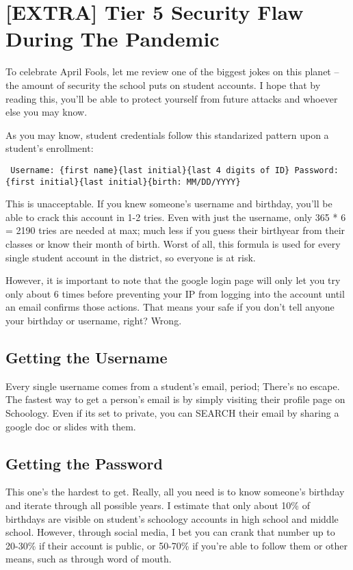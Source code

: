 \section{[EXTRA] Tier 5 Security Flaw During The Pandemic}

To celebrate April Fools, let me review one of the biggest jokes on this planet -- the amount of security the school puts on student accounts. I hope that by reading this, you'll be able to protect yourself from future attacks and whoever else you may know.

As you may know, student credentials follow this standarized pattern upon a student's enrollment:

\begin{centering}
\texttt{
Username: \{first name\}\{last initial\}\{last 4 digits of ID\} \newline
Password: \{first initial\}\{last initial\}\{birth: MM/DD/YYYY\}
}
\end{centering}

This is unacceptable. If you knew someone's username and birthday, you'll be able to crack this account in 1-2 tries. Even with just the username, only 365 * 6 = 2190 tries are needed at max; much less if you guess their birthyear from their classes or know their month of birth. Worst of all, this formula is used for every single student account in the district, so everyone is at risk.

However, it is important to note that the google login page will only let you try only about 6 times before preventing your IP from logging into the account until an email confirms those actions. That means your safe if you don't tell anyone your birthday or username, right? Wrong.

\subsection{Getting the Username}

Every single username comes from a student's email, period; There's no escape. The fastest way to get a person's email is by simply visiting their profile page on Schoology. Even if its set to private, you can SEARCH their email by sharing a google doc or slides with them.

\subsection{Getting the Password}

This one's the hardest to get. Really, all you need is to know someone's birthday and iterate through all possible years. I estimate that only about 10\% of birthdays are visible on student's schoology accounts in high school and middle school. However, through social media, I bet you can crank that number up to 20-30\% if their account is public, or 50-70\% if you're able to follow them or other means, such as through word of mouth.

